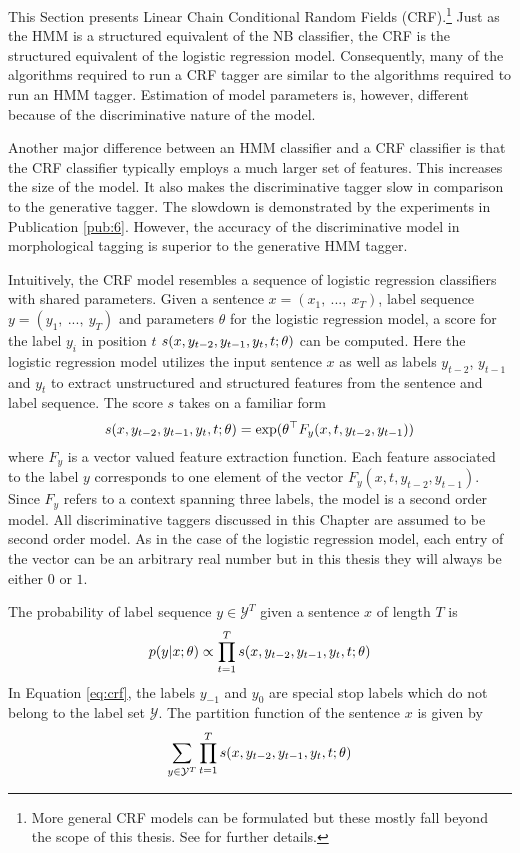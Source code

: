 This Section presents Linear Chain Conditional Random Fields
(CRF).\footnote{More general CRF models can be formulated but these
  mostly fall beyond the scope of this thesis. See \citep{Sutton2012}
  for further details.} Just as the HMM is a structured equivalent of
the NB classifier, the CRF is the structured equivalent of the
logistic regression model. Consequently, many of the algorithms required to run a CRF
tagger are similar to the algorithms required to run an HMM
tagger. Estimation of model parameters is, however, different because
of the discriminative nature of the model.

Another major difference between an HMM classifier and a CRF
classifier is that the CRF classifier typically employs a much larger
set of features. This increases the size of the model. It also makes
the discriminative tagger slow in comparison to the generative
tagger. The slowdown is demonstrated by the experiments in
Publication \ref{pub:6}. However, the accuracy of the discriminative
model in morphological tagging is superior to the generative HMM tagger.

Intuitively, the CRF model resembles a sequence of logistic regression classifiers
with shared parameters. Given a sentence $x = (x_1,\ ...,\ x_T)$,
label sequence $y = (y_1,\ ...,\ y_T)$ and parameters $\theta$ for the
logistic regression model, a score for the label $y_i$ in position $t$ $s(x, y_{t-2},
y_{t-1}, y_t, t\mbox{$ ; \, $} \theta)$ can be computed. Here the logistic regression model
utilizes the input sentence $x$ as well as labels $y_{t - 2}$, $y_{t-1}$ and
$y_t$ to extract unstructured and structured features from the
sentence and label sequence. The score $s$ takes on a familiar form
$$s(x, y_{t-2}, y_{t-1}, y_t, t\mbox{$ ; \, $} \theta) = \exp(\theta^\top F_y(x, t, y_{t-2}, y_{t-1}))$$
where $F_y$ is a vector valued feature extraction function. Each
feature associated to the label $y$ corresponds to one element of the
vector $F_y(x, t, y_{t-2}, y_{t-1})$. Since $F_y$ refers to a context
spanning three labels, the model is a second order model. All
discriminative taggers discussed in this Chapter are assumed to be
second order model. As in the case of the logistic regression model,
each entry of the vector can be an arbitrary real number but in this
thesis they will always be either $0$ or $1$.

The probability of label sequence $y \in \mathcal{Y}^T$ given a sentence $x$ of length $T$ is
\begin{equation}\label{eq:crf}p(y|x\mbox{$ ; \, $}\theta) \propto \prod_{t = 1}^T s(x, y_{t-2}, y_{t-1}, y_t, t\mbox{$ ; \, $} \theta)\end{equation}
In Equation \ref{eq:crf}, the labels $y_{-1}$ and $y_0$ are special
stop labels which do not belong to the label set $\mathcal{Y}$. The partition function of the sentence $x$ is given by
\begin{equation}\sum_{y\in \mathcal{Y}^T}\prod_{t = 1}^T s(x, y_{t-2}, y_{t-1}, y_t, t\mbox{$ ; \, $} \theta)\end{equation}

